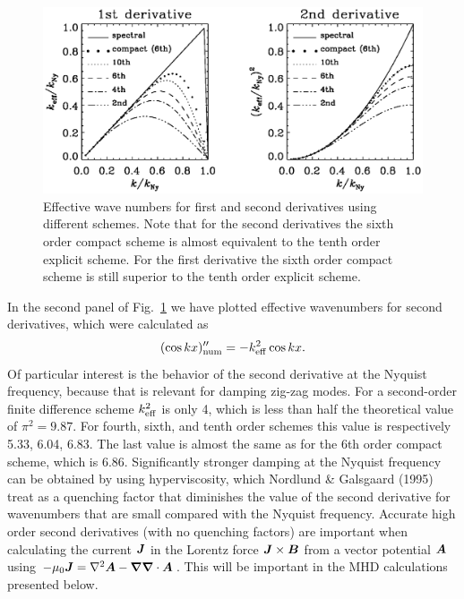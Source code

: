\documentclass[\mydriver,12pt,twoside,notitlepage,a4paper]{article}
\renewcommand{\vec}[1]{\mbox{\boldmath{$#1$}}}
\newcommand{\Av}            {\vec{A}}
\newcommand{\Bv}            {\vec{B}}
\newcommand{\Jv}            {\vec{J}}
\newcommand{\nab}{\mbox{\boldmath $\nabla$} {}}
\begin{document}
\begin{figure}[h!]\begin{center}\includegraphics[width=.99\textwidth]
{pkeff}\end{center}\caption[]{
Effective wave numbers for first and second derivatives using different
schemes. Note that for the second derivatives the sixth order compact
scheme is almost equivalent to the tenth order explicit scheme. For the
first derivative the sixth order compact scheme is still superior to the
tenth order explicit scheme.
}\label{Fpkeff}\end{figure}

In the second panel of Fig.~\ref{Fpkeff} we have plotted effective
wavenumbers for second derivatives, which were calculated as
\begin{equation}
(\cos kx)''_{\rm num}=-k_{\rm eff}^2\cos kx.
\end{equation}
Of particular interest is the behavior of the second derivative at the
Nyquist frequency, because that is relevant for damping zig-zag modes.
For a second-order finite difference scheme $k_{\rm eff}^2$ is only 4,
which is less than half the theoretical value of $\pi^2=9.87$. For fourth,
sixth, and tenth order schemes this value is respectively 5.33, 6.04,
6.83. The last value is almost the same as for the 6th order compact
scheme, which is 6.86. Significantly stronger damping at the Nyquist
frequency can be obtained by using hyperviscosity, which Nordlund \&
Galsgaard (1995) treat as a quenching factor that diminishes the value
of the second derivative for wavenumbers that are small compared with
the Nyquist frequency. Accurate high order second derivatives (with no
quenching factors) are important when calculating the current $\Jv$ in
the Lorentz force $\Jv\times\Bv$ from a vector potential $\Av$ using
$-\mu_0\Jv=\nabla^2\Av-\nab\nab\cdot\Av$. This will be important in
the MHD calculations presented below. 
\end{document}
